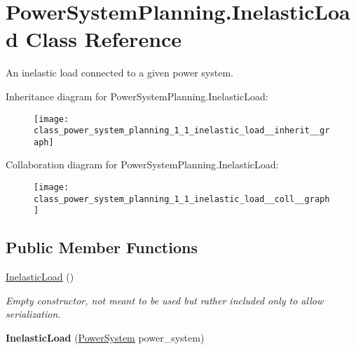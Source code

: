 \hypertarget{class_power_system_planning_1_1_inelastic_load}{}\section{Power\+System\+Planning.\+Inelastic\+Load Class Reference}
\label{class_power_system_planning_1_1_inelastic_load}


An inelastic load connected to a given power system.  




Inheritance diagram for Power\+System\+Planning.\+Inelastic\+Load\+:\nopagebreak
\begin{figure}[H]
\begin{center}
\leavevmode
\texttt{[image: class\_power\_system\_planning\_1\_1\_inelastic\_load\_\_inherit\_\_graph]}
\end{center}
\end{figure}


Collaboration diagram for Power\+System\+Planning.\+Inelastic\+Load\+:\nopagebreak
\begin{figure}[H]
\begin{center}
\leavevmode
\texttt{[image: class\_power\_system\_planning\_1\_1\_inelastic\_load\_\_coll\_\_graph]}
\end{center}
\end{figure}
\subsection*{Public Member Functions}
\begin{DoxyCompactItemize}
\item 
\hyperlink{class_power_system_planning_1_1_inelastic_load_a47abae64f9f66d537230cdff873d9efa}{Inelastic\+Load} ()
\begin{DoxyCompactList}\small\item\em Empty constructor, not meant to be used but rather included only to allow serialization. \end{DoxyCompactList}\item 
{\bfseries Inelastic\+Load} (\hyperlink{class_power_system_planning_1_1_power_system}{Power\+System} power\+\_\+system)\hypertarget{class_power_system_planning_1_1_inelastic_load_a8ff8d78ce9c7189100619c82f0038a61}{}\label{class_power_system_planning_1_1_inelastic_load_a8ff8d78ce9c7189100619c82f0038a61}

\end{DoxyCompactItemize}
